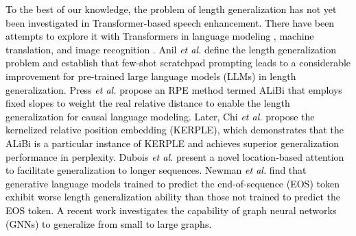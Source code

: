 \documentclass[journal]{IEEEtran}
\begin{document}
\textcolor{black}{To the best of our knowledge, the problem of length generalization has not yet been investigated in Transformer-based speech enhancement. There have been attempts to explore it with Transformers in language modeling \cite{kerple,alibi,anil2022exploring}, machine translation, and image recognition \cite{likhomanenko2021cape}. Anil \textit{et al.} \cite{anil2022exploring} define the length generalization problem and establish that few-shot scratchpad prompting leads to a considerable improvement for pre-trained large language models (LLMs) in length generalization. Press \textit{et al.} \cite{alibi} propose an RPE method termed ALiBi that employs fixed slopes to weight the real relative distance to enable the length generalization for causal language modeling. Later, Chi \textit{et al.} \cite{kerple} propose the kernelized relative position embedding (KERPLE), which demonstrates that the ALiBi is a particular instance of KERPLE and achieves superior generalization performance \cite{kerple} in perplexity. Dubois \textit{et al.} \cite{dubois2020location} present a novel location-based attention to facilitate generalization to longer sequences. Newman \textit{et al.} \cite{newman2020extrapolation} find that generative language models trained to predict the end-of-sequence (EOS) token exhibit worse length generalization ability than those not trained to predict the EOS token. A recent work \cite{yehudai2021local} investigates the capability of graph neural networks (GNNs) to generalize from small to large graphs.}





\end{document}
